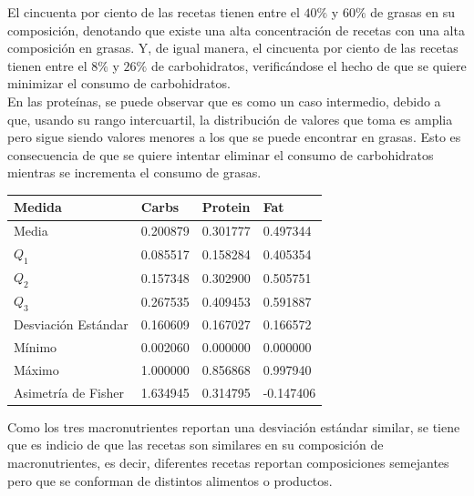 \documentclass[12pt,a4paper]{article}
\begin{document}
            El cincuenta por ciento de las recetas tienen entre el $40\%$ y 
            $60\%$ de grasas en su composición, denotando que existe una alta 
            concentración de recetas con una alta composición en grasas. Y, de 
            igual manera, el cincuenta por ciento de las recetas tienen entre 
            el $8\%$ y $26\%$ de carbohidratos, verificándose el hecho de que 
            se quiere minimizar el consumo de carbohidratos.\\

            En las proteínas, se puede observar que es como un caso intermedio, 
            debido a que, usando su rango intercuartil, la distribución de valores 
            que toma es amplia pero sigue siendo valores menores a los que se puede 
            encontrar en grasas. Esto es consecuencia de que se quiere intentar 
            eliminar el consumo de carbohidratos mientras se incrementa el consumo 
            de grasas.

            \begin{center}
                \begin{tabular}{l|lll}
                    \toprule
                        Medida & Carbs & Protein & Fat \\
                    \midrule
                        Media               & 0.200879 & 0.301777 & 0.497344  \\
                        $Q_1$               & 0.085517 & 0.158284 & 0.405354  \\
                        $Q_2$               & 0.157348 & 0.302900 & 0.505751  \\
                        $Q_3$               & 0.267535 & 0.409453 & 0.591887  \\
                        Desviación Estándar & 0.160609 & 0.167027 & 0.166572  \\
                        Mínimo              & 0.002060 & 0.000000 & 0.000000  \\
                        Máximo              & 1.000000 & 0.856868 & 0.997940  \\
                        Asimetría de Fisher & 1.634945 & 0.314795 & -0.147406 \\
                    \bottomrule
                \end{tabular}
            \end{center}

            Como los tres macronutrientes reportan una desviación estándar similar, 
            se tiene que es indicio de que las recetas son similares en su composición 
            de macronutrientes, es decir, diferentes recetas reportan composiciones 
            semejantes pero que se conforman de distintos alimentos o productos.\\
\end{document}
